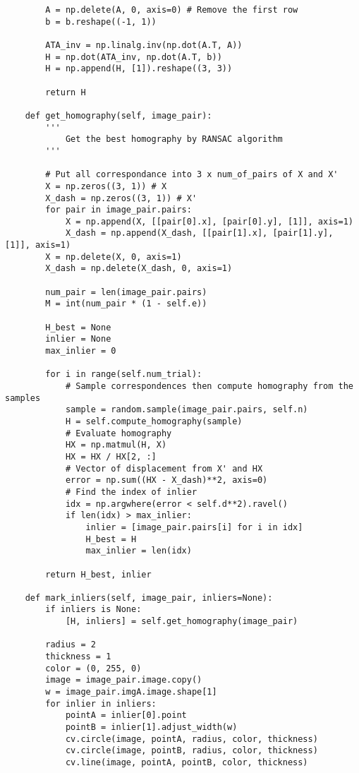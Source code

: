 \documentclass[11pt]{article}
\begin{document}
\begin{lstlisting}
        A = np.delete(A, 0, axis=0) # Remove the first row
        b = b.reshape((-1, 1))

        ATA_inv = np.linalg.inv(np.dot(A.T, A))
        H = np.dot(ATA_inv, np.dot(A.T, b))
        H = np.append(H, [1]).reshape((3, 3))

        return H

    def get_homography(self, image_pair):
        '''
            Get the best homography by RANSAC algorithm
        '''

        # Put all correspondance into 3 x num_of_pairs of X and X'
        X = np.zeros((3, 1)) # X
        X_dash = np.zeros((3, 1)) # X'
        for pair in image_pair.pairs:
            X = np.append(X, [[pair[0].x], [pair[0].y], [1]], axis=1)
            X_dash = np.append(X_dash, [[pair[1].x], [pair[1].y], [1]], axis=1)
        X = np.delete(X, 0, axis=1)
        X_dash = np.delete(X_dash, 0, axis=1)
  
        num_pair = len(image_pair.pairs)
        M = int(num_pair * (1 - self.e))

        H_best = None
        inlier = None
        max_inlier = 0
        
        for i in range(self.num_trial):
            # Sample correspondences then compute homography from the samples
            sample = random.sample(image_pair.pairs, self.n)
            H = self.compute_homography(sample)
            # Evaluate homography
            HX = np.matmul(H, X)
            HX = HX / HX[2, :]
            # Vector of displacement from X' and HX
            error = np.sum((HX - X_dash)**2, axis=0)
            # Find the index of inlier
            idx = np.argwhere(error < self.d**2).ravel()
            if len(idx) > max_inlier:
                inlier = [image_pair.pairs[i] for i in idx]
                H_best = H
                max_inlier = len(idx)
        
        return H_best, inlier

    def mark_inliers(self, image_pair, inliers=None):
        if inliers is None:
            [H, inliers] = self.get_homography(image_pair)
        
        radius = 2
        thickness = 1
        color = (0, 255, 0)
        image = image_pair.image.copy()
        w = image_pair.imgA.image.shape[1]
        for inlier in inliers:
            pointA = inlier[0].point
            pointB = inlier[1].adjust_width(w)
            cv.circle(image, pointA, radius, color, thickness)
            cv.circle(image, pointB, radius, color, thickness)
            cv.line(image, pointA, pointB, color, thickness)


\end{lstlisting}
\end{document}
